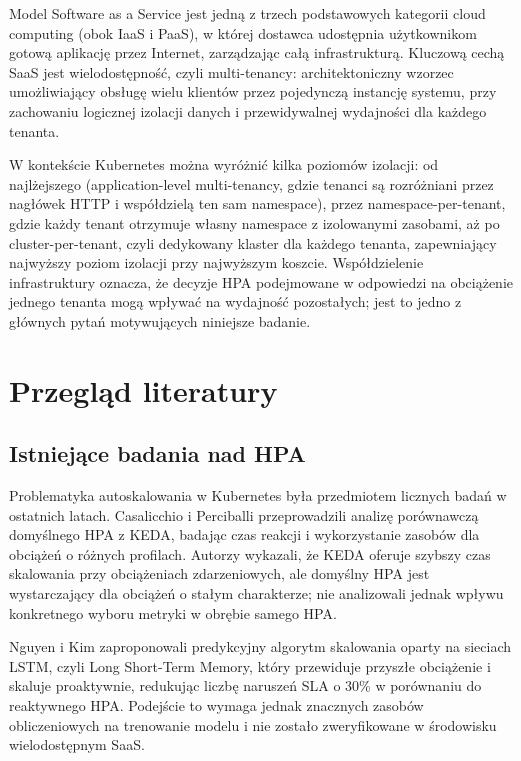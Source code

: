 Model Software as a Service jest jedną z trzech podstawowych kategorii cloud computing (obok IaaS i PaaS), w której dostawca udostępnia użytkownikom gotową aplikację przez Internet, zarządzając całą infrastrukturą. Kluczową cechą SaaS jest wielodostępność, czyli multi-tenancy: architektoniczny wzorzec umożliwiający obsługę wielu klientów przez pojedynczą instancję systemu, przy zachowaniu logicznej izolacji danych i przewidywalnej wydajności dla każdego tenanta.

W kontekście Kubernetes można wyróżnić kilka poziomów izolacji: od najlżejszego (application-level multi-tenancy, gdzie tenanci są rozróżniani przez nagłówek HTTP i współdzielą ten sam namespace), przez namespace-per-tenant, gdzie każdy tenant otrzymuje własny namespace z izolowanymi zasobami, aż po cluster-per-tenant, czyli dedykowany klaster dla każdego tenanta, zapewniający najwyższy poziom izolacji przy najwyższym koszcie. Współdzielenie infrastruktury oznacza, że decyzje HPA podejmowane w odpowiedzi na obciążenie jednego tenanta mogą wpływać na wydajność pozostałych; jest to jedno z głównych pytań motywujących niniejsze badanie.

\section{Przegląd literatury}

\subsection{Istniejące badania nad HPA}

Problematyka autoskalowania w Kubernetes była przedmiotem licznych badań w ostatnich latach. Casalicchio i Perciballi \cite{huawei2021} przeprowadzili analizę porównawczą domyślnego HPA z KEDA, badając czas reakcji i wykorzystanie zasobów dla obciążeń o różnych profilach. Autorzy wykazali, że KEDA oferuje szybszy czas skalowania przy obciążeniach zdarzeniowych, ale domyślny HPA jest wystarczający dla obciążeń o stałym charakterze; nie analizowali jednak wpływu konkretnego wyboru metryki w obrębie samego HPA.

Nguyen i Kim zaproponowali predykcyjny algorytm skalowania oparty na sieciach LSTM, czyli Long Short-Term Memory, który przewiduje przyszłe obciążenie i skaluje proaktywnie, redukując liczbę naruszeń SLA o 30\% w porównaniu do reaktywnego HPA. Podejście to wymaga jednak znacznych zasobów obliczeniowych na trenowanie modelu i nie zostało zweryfikowane w środowisku wielodostępnym SaaS.

